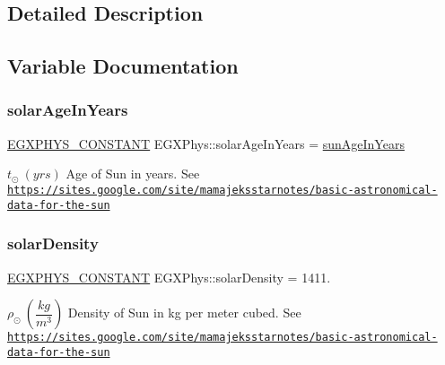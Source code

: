 \subsection{Detailed Description}


\subsection{Variable Documentation}
\mbox{\label{group___e_g_x_phys-_constants-_astrophysics-_solar_system-_sun-_bulk_ga51282485762d0d1f23a15ac028bbdc47}} 
\subsubsection{\texorpdfstring{solar\+Age\+In\+Years}{solarAgeInYears}}
{\footnotesize\ttfamily \mbox{\hyperlink{group___e_g_x_phys-_constants-_macros_ga76980d288494ce1714c9ac68a95ba702}{E\+G\+X\+P\+H\+Y\+S\+\_\+\+C\+O\+N\+S\+T\+A\+NT}} E\+G\+X\+Phys\+::solar\+Age\+In\+Years = \mbox{\hyperlink{group___e_g_x_phys-_constants-_astrophysics-_solar_system-_sun-_bulk_ga940159140fc0eb1f661748d424b26b51}{sun\+Age\+In\+Years}}}

$t_{\odot} \ (yrs)$ Age of Sun in years. See \href{https://sites.google.com/site/mamajeksstarnotes/basic-astronomical-data-for-the-sun}{\tt https\+://sites.\+google.\+com/site/mamajeksstarnotes/basic-\/astronomical-\/data-\/for-\/the-\/sun} \mbox{\label{group___e_g_x_phys-_constants-_astrophysics-_solar_system-_sun-_bulk_gad529e58b7a92599270e10726d55b72c2}} 
\subsubsection{\texorpdfstring{solar\+Density}{solarDensity}}
{\footnotesize\ttfamily \mbox{\hyperlink{group___e_g_x_phys-_constants-_macros_ga76980d288494ce1714c9ac68a95ba702}{E\+G\+X\+P\+H\+Y\+S\+\_\+\+C\+O\+N\+S\+T\+A\+NT}} E\+G\+X\+Phys\+::solar\+Density = 1411.}

$\rho_{\odot} \ (\dfrac{kg}{m^3})$ Density of Sun in kg per meter cubed. See \href{https://sites.google.com/site/mamajeksstarnotes/basic-astronomical-data-for-the-sun}{\tt https\+://sites.\+google.\+com/site/mamajeksstarnotes/basic-\/astronomical-\/data-\/for-\/the-\/sun} \mbox{\label{group___e_g_x_phys-_constants-_astrophysics-_solar_system-_sun-_bulk_gaa1a1a67eb8247ed92dc7869afbcfbdc3}} 
